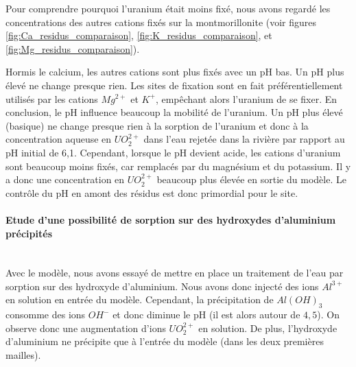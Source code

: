 \documentclass{article}
\begin{document}
Pour comprendre pourquoi l’uranium était moins fixé, nous avons regardé les concentrations des autres cations fixés sur la montmorillonite (voir figures \ref{fig:Ca_residus_comparaison}, \ref{fig:K_residus_comparaison}, et \ref{fig:Mg_residus_comparaison}).

Hormis le calcium, les autres cations sont plus fixés avec un pH bas. Un pH plus élevé ne change presque rien. Les sites de fixation sont en fait préférentiellement utilisés par les cations $Mg^{2+}$ et $K^{+}$, empêchant alors l’uranium de se fixer.
En conclusion, le pH influence beaucoup la mobilité de l’uranium. Un pH plus élevé (basique) ne change presque rien à la sorption de l’uranium et donc à la concentration aqueuse en $UO_2^{2+}$ dans l’eau rejetée dans la rivière par rapport au pH initial de 6,1. Cependant, lorsque le pH devient acide, les cations d’uranium sont beaucoup moins fixés, car remplacés par du magnésium et du potassium. Il y a donc une concentration en $UO_2^{2+}$ beaucoup plus élevée en sortie du modèle. Le contrôle du pH en amont des résidus est donc primordial pour le site.

\paragraph{Etude d'une possibilité de sorption sur des hydroxydes d'aluminium précipités \\ \\}
Avec le modèle, nous avons essayé de mettre en place un traitement de l’eau par sorption sur des hydroxyde d’aluminium. Nous avons donc injecté des ions $Al^{3+}$ en solution en entrée du modèle. Cependant, la précipitation de $Al(OH)_3$ consomme des ions $OH^{-}$ et donc diminue le pH (il est alors autour de $4,5$). On observe donc une augmentation d’ions $UO_2^{2+}$ en solution. De plus, l’hydroxyde d’aluminium ne précipite que à l’entrée du modèle (dans les deux premières mailles).
\end{document}
